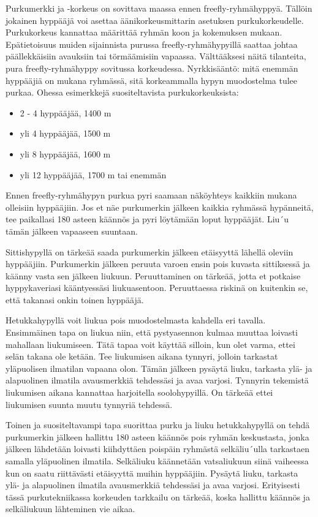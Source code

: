 Purkumerkki ja -korkeus on sovittava maassa ennen freefly-ryhmähyppyä. Tällöin jokainen hyppääjä voi asettaa äänikorkeusmittarin asetuksen purkukorkeudelle. Purkukorkeus kannattaa määrittää ryhmän koon ja kokemuksen mukaan. Epätietoisuus muiden sijainnista purussa freefly-ryhmähypyillä saattaa johtaa päällekkäisiin avauksiin tai törmäämisiin vapaassa. Välttääksesi näitä tilanteita, pura freefly-ryhmähyppy sovitussa korkeudessa. Nyrkkisääntö: mitä enemmän hyppääjiä on mukana ryhmässä, sitä korkeammalla hypyn muodostelma tulee purkaa. Ohessa esimerkkejä suositeltavista purkukorkeuksista: 

\begin{itemize}
\item  2 - 4 hyppääjää, 1400 m 
\item  yli 4 hyppääjää, 1500 m 
\item  yli 8 hyppääjää, 1600 m  
\item  yli 12 hyppääjää, 1700 m tai enemmän 
\end{itemize}

Ennen freefly-ryhmähypyn purkua pyri saamaan näköyhteys kaikkiin mukana olleisiin hyppääjiin. Jos et näe purkumerkin jälkeen kaikkia ryhmässä hypänneitä, tee paikallasi 180 asteen käännös ja pyri löytämään loput hyppääjät. Liu´u tämän jälkeen vapaaseen suuntaan. 


Sittishypyllä on tärkeää saada purkumerkin jälkeen etäisyyttä lähellä oleviin hyppääjiin. Purkumerkin jälkeen peruuta varoen ensin pois kuvasta sittiksessä ja käänny vasta sen jälkeen liukuun. Peruuttaminen on tärkeää, jotta et potkaise hyppykaveriasi kääntyessäsi liukuasentoon. Peruuttaessa riskinä on kuitenkin se, että takanasi onkin toinen hyppääjä. 


Hetukkahypyllä voit liukua pois muodostelmasta kahdella eri tavalla. Ensimmäinen tapa on liukua niin, että pystyasennon kulmaa muuttaa loivasti mahallaan liukumiseen. Tätä tapaa voit käyttää silloin, kun olet varma, ettei selän takana ole ketään. Tee liukumisen aikana tynnyri, jolloin tarkastat yläpuolisen ilmatilan vapaana olon. Tämän jälkeen pysäytä liuku, tarkasta ylä- ja alapuolinen ilmatila avausmerkkiä tehdessäsi ja avaa varjosi. Tynnyrin tekemistä liukumisen aikana kannattaa harjoitella soolohypyillä. On tärkeää ettei liukumisen suunta muutu tynnyriä tehdessä. 


Toinen ja suositeltavampi tapa suorittaa purku ja liuku hetukkahypyllä on tehdä purkumerkin jälkeen hallittu 180 asteen käännös pois ryhmän keskustasta, jonka jälkeen lähdetään loivasti kiihdyttäen poispäin ryhmästä selkäliu´ulla tarkastaen samalla yläpuolinen ilmatila. Selkäliuku käännetään vatsaliukuun siinä vaiheessa kun on saatu riittävästi etäisyyttä muihin hyppääjiin. Pysäytä liuku, tarkasta ylä- ja alapuolinen ilmatila avausmerkkiä tehdessäsi ja avaa varjosi. Erityisesti tässä purkutekniikassa korkeuden tarkkailu on tärkeää, koska hallittu käännös ja selkäliukuun lähteminen vie aikaa. 


